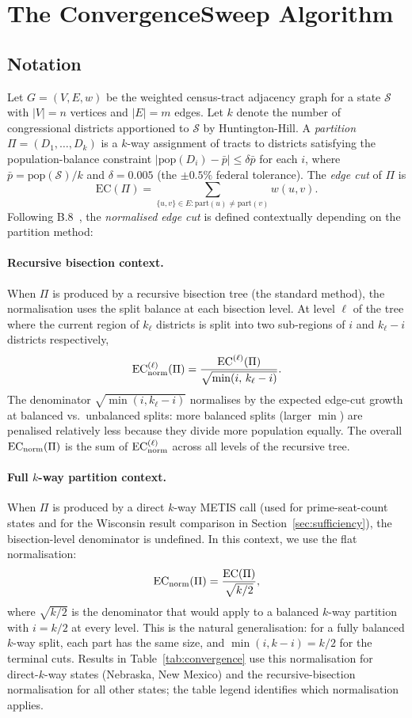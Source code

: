 \section{The ConvergenceSweep Algorithm}
\label{sec:algorithm}

\subsection{Notation}

Let $G = (V, E, w)$ be the weighted census-tract adjacency graph for a state
$\mathcal{S}$ with $|V| = n$ vertices and $|E| = m$ edges.
Let $k$ denote the number of congressional districts apportioned to
$\mathcal{S}$ by Huntington-Hill.
A \emph{partition} $\Pi = (D_1, \ldots, D_k)$ is a $k$-way assignment of
tracts to districts satisfying the population-balance constraint
$|\mathrm{pop}(D_i) - \bar{p}| \le \delta \bar{p}$ for each $i$, where
$\bar{p} = \mathrm{pop}(\mathcal{S})/k$ and $\delta = 0.005$ (the
$\pm 0.5\%$ federal tolerance).
The \emph{edge cut} of $\Pi$ is
\[
  \mathrm{EC}(\Pi) = \sum_{\{u,v\} \in E: \text{part}(u) \ne \text{part}(v)} w(u,v).
\]
Following B.8~\citep{b8paper}, the \emph{normalised edge cut} is defined
contextually depending on the partition method:

\paragraph{Recursive bisection context.}
When $\Pi$ is produced by a recursive bisection tree (the standard \ar{}
method), the normalisation uses the split balance at each bisection level.
At level $\ell$ of the tree where the current region of $k_\ell$ districts
is split into two sub-regions of $i$ and $k_\ell - i$ districts respectively,
\[
  \mathrm{EC}_{\mathrm{norm}}^{(\ell)}(\Pi) = \frac{\mathrm{EC}^{(\ell)}(\Pi)}{\sqrt{\min(i,\, k_\ell - i)}}.
\]
The denominator $\sqrt{\min(i, k_\ell - i)}$ normalises by the expected
edge-cut growth at balanced vs.\ unbalanced splits: more balanced splits
(larger $\min$) are penalised relatively less because they divide more population
equally.
The overall $\mathrm{EC}_{\mathrm{norm}}(\Pi)$ is the sum of $\mathrm{EC}_{\mathrm{norm}}^{(\ell)}$ across all levels
of the recursive tree.

\paragraph{Full $k$-way partition context.}
When $\Pi$ is produced by a direct $k$-way METIS call (used for prime-seat-count
states and for the Wisconsin result comparison in Section~\ref{sec:sufficiency}),
the bisection-level denominator is undefined.
In this context, we use the flat normalisation:
\[
  \mathrm{EC}_{\mathrm{norm}}(\Pi) = \frac{\mathrm{EC}(\Pi)}{\sqrt{k/2}},
\]
where $\sqrt{k/2}$ is the denominator that would apply to a balanced $k$-way
partition with $i = k/2$ at every level.
This is the natural generalisation: for a fully balanced $k$-way split, each
part has the same size, and $\min(i, k-i) = k/2$ for the terminal cuts.
Results in Table~\ref{tab:convergence} use this normalisation for
direct-$k$-way states (Nebraska, New Mexico) and the recursive-bisection
normalisation for all other states; the table legend identifies which
normalisation applies.

